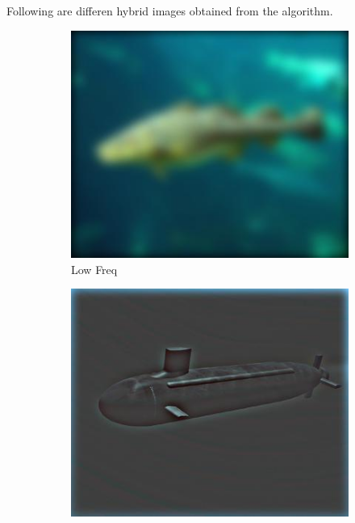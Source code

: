 \documentclass{bmvc2k}
\begin{document}
Following are differen hybrid images obtained from the algorithm. 

\begin{figure}[h!]
  \centering
  \begin{subfigure}[b]{0.2\linewidth}
    \includegraphics[width=\linewidth]{images/Fish_Sub/low_frequencies_fish_submarine.jpg}
     \caption{Low Freq}
  \end{subfigure}
  \begin{subfigure}[b]{0.2\linewidth}
    \includegraphics[width=\linewidth]{images/Fish_Sub/high_frequencies_fish_submarine.jpg}

\end{subfigure}
\end{figure}
\end{document}
